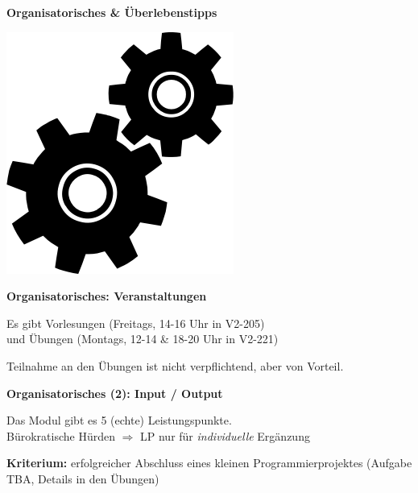 \documentclass[unknownkeysallowed]{beamer}
\begin{document}
  \begin{frame}

    \begin{center}
    \Large\textbf{Organisatorisches \& Überlebenstipps} \bigskip
    
    \includegraphics[scale=0.3]{Noun-project-1063.png} 
    \end{center}
  \end{frame}

  
  \begin{frame}
    \Large\textbf{Organisatorisches: Veranstaltungen}\bigskip \normalsize
    
    Es gibt Vorlesungen (Freitags, 14-16 Uhr in V2-205)\\
    und Übungen (Montags, 12-14 \& 18-20 Uhr in V2-221)\bigskip
	
	Teilnahme an den Übungen ist nicht verpflichtend, aber von Vorteil.  
  \end{frame}
  
  
  \begin{frame}
    \Large\textbf{Organisatorisches (2): Input / Output}\bigskip \normalsize
    
    Das Modul gibt es 5 (echte) Leistungspunkte.\\
    Bürokratische Hürden $\Rightarrow$ LP nur für \emph{individuelle} Ergänzung \bigskip
    
    \textbf{Kriterium:} erfolgreicher Abschluss eines kleinen Programmierprojektes
    (Aufgabe TBA, Details in den Übungen)
  \end{frame}
  
\end{document}
